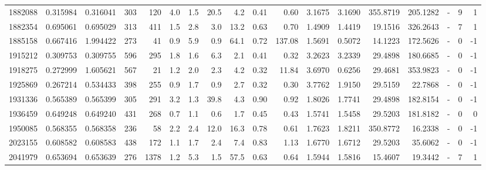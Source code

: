 \begin{tabular}{rrrrrrrrrrrrrrrlrr}
   1882088 & 0.315984 &   0.316041 &  303 &  120 &      4.0 &      1.5 &    20.5 &      4.2 &       0.41 &        0.60 &  3.1675 &  3.1690 &  355.8719 &  205.1282 &             - &        9 &          1 \\
   1882354 & 0.695061 &   0.695029 &  313 &  411 &      1.5 &      2.8 &     3.0 &     13.2 &       0.63 &        0.70 &  1.4909 &  1.4419 &   19.1516 &  326.2643 &             - &        7 &          1 \\
   1885158 & 0.667416 &   1.994422 &  273 &   41 &      0.9 &      5.9 &     0.9 &     64.1 &       0.72 &      137.08 &  1.5691 &  0.5072 &   14.1223 &  172.5626 &             - &        0 &         -1 \\
   1915212 & 0.309753 &   0.309755 &  596 &  295 &      1.8 &      1.6 &     6.3 &      2.1 &       0.41 &        0.32 &  3.2623 &  3.2339 &   29.4898 &  180.6685 &             - &        0 &         -1 \\
   1918275 & 0.272999 &   1.605621 &  567 &   21 &      1.2 &      2.0 &     2.3 &      4.2 &       0.32 &       11.84 &  3.6970 &  0.6256 &   29.4681 &  353.9823 &             - &        0 &         -1 \\
   1925869 & 0.267214 &   0.534433 &  398 &  255 &      0.9 &      1.7 &     0.9 &      2.7 &       0.32 &        0.30 &  3.7762 &  1.9150 &   29.5159 &   22.7868 &             - &        0 &         -1 \\
   1931336 & 0.565389 &   0.565399 &  305 &  291 &      3.2 &      1.3 &    39.8 &      4.3 &       0.90 &        0.92 &  1.8026 &  1.7741 &   29.4898 &  182.8154 &             - &        0 &         -1 \\
   1936459 & 0.649248 &   0.649240 &  431 &  268 &      0.7 &      1.1 &     0.6 &      1.7 &       0.45 &        0.43 &  1.5741 &  1.5458 &   29.5203 &  181.8182 &             - &        0 &          0 \\
   1950085 & 0.568355 &   0.568358 &  236 &   58 &      2.2 &      2.4 &    12.0 &     16.3 &       0.78 &        0.61 &  1.7623 &  1.8211 &  350.8772 &   16.2338 &             - &        0 &         -1 \\
   2023155 & 0.608582 &   0.608583 &  438 &  172 &      1.1 &      1.7 &     2.4 &      7.4 &       0.83 &        1.13 &  1.6770 &  1.6712 &   29.5203 &   35.6062 &             - &        0 &         -1 \\
   2041979 & 0.653694 &   0.653639 &  276 & 1378 &      1.2 &      5.3 &     1.5 &     57.5 &       0.63 &        0.64 &  1.5944 &  1.5816 &   15.4607 &   19.3442 &             - &        7 &          1 \\

\end{tabular}
